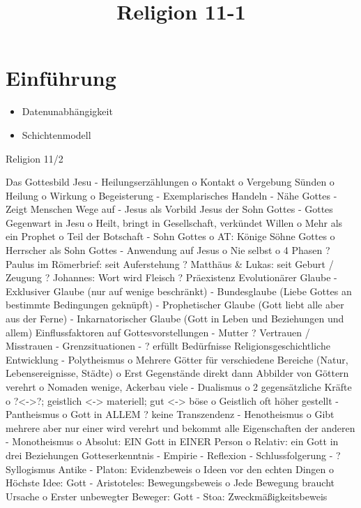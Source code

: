 \documentclass[11pt, paper=a4, twocolumn]{scrartcl}
\title{\vspace{-1.25cm}Religion 11-1\vspace{-0.25cm}}
\date{\vspace{-5ex}}
\begin{document}
	\maketitle


	\section{Einführung}
		\begin{itemize}
			\item Datenunabhängigkeit
			\item Schichtenmodell
		\end{itemize}



Religion 11/2

 
Das Gottesbild Jesu
-	Heilungserzählungen
o	Kontakt
o	Vergebung Sünden
o	Heilung
o	Wirkung
o	Begeisterung
-	Exemplarisches Handeln
-	Nähe Gottes
-	Zeigt Menschen Wege auf
-	Jesus als Vorbild
Jesus der Sohn Gottes
-	Gottes Gegenwart in Jesu
o	Heilt, bringt in Gesellschaft, verkündet Willen
o	Mehr als ein Prophet
o	Teil der Botschaft
-	Sohn Gottes
o	AT: Könige Söhne Gottes
o	Herrscher als Sohn Gottes
-	Anwendung auf Jesus
o	Nie selbst
o	4 Phasen
?	Paulus im Römerbrief:
seit Auferstehung
?	Matthäus & Lukas:
seit Geburt / Zeugung
?	Johannes:
Wort wird Fleisch ? Präexistenz
Evolutionärer Glaube
-	Exklusiver Glaube (nur auf wenige beschränkt)
-	Bundesglaube (Liebe Gottes an bestimmte Bedingungen geknüpft)
-	Prophetischer Glaube (Gott liebt alle aber aus der Ferne)
-	Inkarnatorischer Glaube (Gott in Leben und Beziehungen und allem)
Einflussfaktoren auf Gottesvorstellungen
-	Mutter ? Vertrauen / Misstrauen
-	Grenzsituationen
-	? erfüllt Bedürfnisse
Religionsgeschichtliche Entwicklung
-	Polytheismus
o	Mehrere Götter für verschiedene Bereiche (Natur, Lebensereignisse, Städte)
o	Erst Gegenstände direkt dann Abbilder von Göttern verehrt
o	Nomaden wenige, Ackerbau viele
-	Dualismus
o	2 gegensätzliche Kräfte
o	?<->?; geistlich <-> materiell;
gut <-> böse
o	Geistlich oft höher gestellt
-	Pantheismus
o	Gott in ALLEM ? keine Transzendenz
-	Henotheismus
o	Gibt mehrere aber nur einer wird verehrt und bekommt alle Eigenschaften der anderen
-	Monotheismus
o	Absolut: EIN Gott in EINER Person
o	Relativ: ein Gott in drei Beziehungen
Gotteserkenntnis
-	Empirie
-	Reflexion
-	Schlussfolgerung
-	? Syllogismus
Antike
-	Platon: Evidenzbeweis
o	Ideen vor den echten Dingen
o	Höchste Idee: Gott
-	Aristoteles: Bewegungsbeweis
o	Jede Bewegung braucht Ursache
o	Erster unbewegter Beweger: Gott
-	Stoa: Zweckmäßigkeitsbeweis
\end{document}
